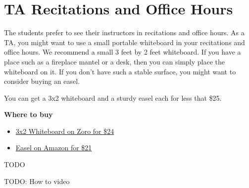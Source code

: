 \chapter{TA Recitations and Office Hours}

\begin{gram}

The students prefer to see their instructors in recitations and office
hours. As a TA, you might want to use a small portable whiteboard in
your recitations and office hours.  We recommend a small 3 feet by 2
feet whiteboard.  If you have a place such as a fireplace mantel or a
desk, then you can simply place the whiteboard on it.  If you don't
have such a stable surface, you might want to consider buying an
easel.

You can get a 3x2 whiteboard and a sturdy easel each for less that \$25.  

\textbf{Where to buy}
\begin{itemize}
\item

\href{https://www.zoro.com/zoro-select-dry-erase-board-36-w-silver-1nup9/i/G1291367/}{3x2
  Whiteboard on Zoro for \$24}

\item 
\href{https://www.amazon.com/Reinforced-Aluminum-Adjustable-Table-Top-Displaying/dp/B076X3WZHB/ref=sr_1_1_sspa?dchild=1&keywords=easel&qid=1597681145&s=office-products&sr=1-1-spons&psc=1&spLa=ZW5jcnlwdGVkUXVhbGlmaWVyPUExS1NMVkxEU1JZMVBHJmVuY3J5cHRlZElkPUEwMzQ3ODQwM1FYWDJCUFE0UzVMUSZlbmNyeXB0ZWRBZElkPUEwMzU2NjAyM0hVSEtONUpEOE4yMiZ3aWRnZXROYW1lPXNwX2F0ZiZhY3Rpb249Y2xpY2tSZWRpcmVjdCZkb05vdExvZ0NsaWNrPXRydWU=}
{Easel on Amazon for \$21}

\end{itemize}

\end{gram}

\begin{gram}
TODO
\end{gram}


\begin{gram}[How]
TODO: How to video
\end{gram}
